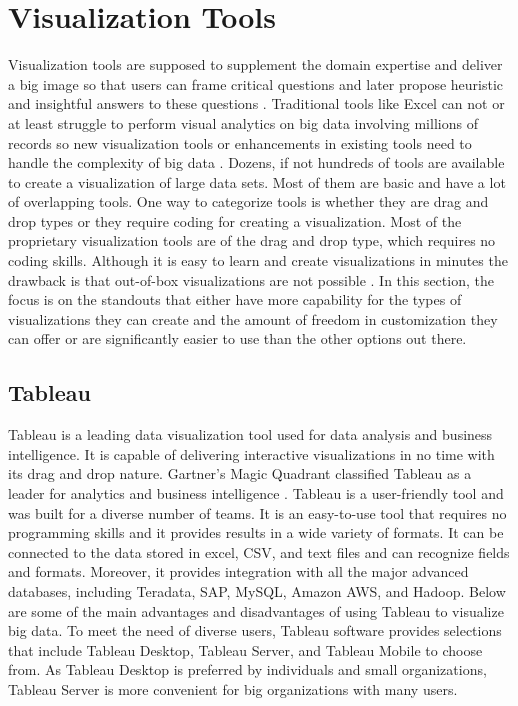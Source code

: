 \section{Visualization Tools}

Visualization tools are supposed to supplement the domain expertise and deliver a big image so that users can frame critical questions and later propose heuristic and insightful answers to these questions \cite{kung2015visualization}. Traditional tools like Excel can not or at least struggle to perform visual analytics on big data involving millions of records so new visualization tools or enhancements in existing tools need to handle the complexity of big data \cite{nair2016interactive}. Dozens, if not hundreds of tools are available to create a visualization of large data sets. Most of them are basic and have a lot of overlapping tools. One way to categorize tools is whether they are drag and drop types or they require coding for creating a visualization. Most of the proprietary visualization tools are of the drag and drop type, which requires no coding skills. Although it is easy to learn and create visualizations in minutes the drawback is that out-of-box visualizations are not possible \cite{nair2016interactive}. In this section, the focus is on the standouts that either have more capability for the types of visualizations they can create and the amount of freedom in customization they can offer or are significantly easier to use than the other options out there. 

\subsection{Tableau}

Tableau is a leading data visualization tool used for data analysis and business intelligence. It is capable of delivering interactive visualizations in no time with its drag and drop nature. Gartner’s Magic Quadrant classified Tableau as a leader for analytics and business intelligence \cite{parenteau2016magic}. Tableau is a user-friendly tool and was built for a diverse number of teams. It is an easy-to-use tool that requires no programming skills and it provides results in a wide variety of formats. It can be connected to the data stored in excel, CSV, and text files and can recognize fields and formats. Moreover, it provides integration with all the major advanced databases, including Teradata, SAP, MySQL, Amazon AWS, and Hadoop. Below are some of the main advantages and disadvantages of using Tableau to visualize big data. To meet the need of diverse users, Tableau software provides selections that include Tableau Desktop, Tableau Server, and Tableau Mobile to choose from. As Tableau Desktop is preferred by individuals and small organizations, Tableau Server is more convenient for big organizations with many users.

